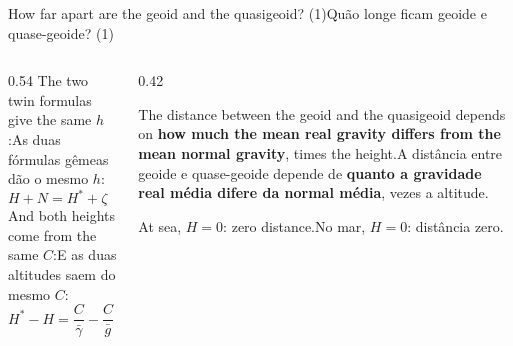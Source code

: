 \documentclass[aspectratio=169,11pt]{beamer}
\newcommand{\tr}[2]{\ifEN#2\else#1\fi}
\newcommand{\bnum}[1]{\textbf{\textcolor{mTeal}{#1}}}
\begin{document}
\begin{frame}{\tr{Quão longe ficam geoide e quase-geoide? (1)}{How far apart are the geoid and
  the quasigeoid? (1)}}
  \begin{columns}[T]
    \begin{column}{0.54\textwidth}
      \tr{As duas fórmulas gêmeas dão o mesmo $h$:}{The two twin formulas give the same $h$:}
      \[ H + N = H^{*} + \zeta \quad\Longrightarrow\quad N - \zeta = H^{*} - H \]
      \tr{E as duas altitudes saem do mesmo $C$:}{And both heights come from the same $C$:}
      \[ H^{*} - H = \frac{C}{\bar\gamma} - \frac{C}{\bar g}
                   = \frac{C}{\bar g}\cdot\frac{\bar g - \bar\gamma}{\bar\gamma}
                   = H\,\frac{\bar g - \bar\gamma}{\bar\gamma} \]
    \end{column}
    \begin{column}{0.42\textwidth}
      \begin{ideia}[title={\tr{Em palavras}{In words}}]
        \tr{A distância entre geoide e quase-geoide depende de \bnum{quanto a gravidade real
        média difere da normal média}, vezes a altitude.}{The distance between the geoid and
        the quasigeoid depends on \bnum{how much the mean real gravity differs from the mean
        normal gravity}, times the height.}
        \medskip

        \tr{No mar, $H = 0$: distância zero.}{At sea, $H = 0$: zero distance.}
      \end{ideia}
    \end{column}
  \end{columns}
\end{frame}
\end{document}
